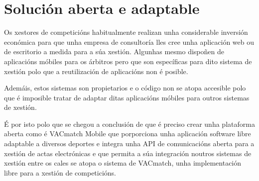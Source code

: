 
  \section{Solución aberta e adaptable}

  Os xestores de competicións habitualmente realizan unha considerable inversión 
económica para que unha empresa de consultoría lles cree unha aplicación web ou de 
escritorio a medida para a súa xestión. Algunhas mesmo dispoñen de aplicacións móbiles 
para os árbitros pero que son específicas para dito sistema de xestión polo que a 
reutilización de aplicacións non é posible.

  Ademáis, estos sistemas son propietarios e o código non se atopa accesible 
polo que é imposible tratar de adaptar ditas aplicacións móbiles para outros 
sistemas de xestión.

  É por isto polo que se chegou a conclusión de que é preciso crear unha 
plataforma aberta como é VACmatch Mobile que porporciona unha aplicación 
software libre adaptable a diversos deportes e integra unha API de comunicacións 
aberta para a xestión de actas electrónicas e que permita a súa integración 
noutros sistemas de xestión entre os cales se atopa o sistema de VACmatch, unha 
implementación libre para a xestión de competicións.

  
